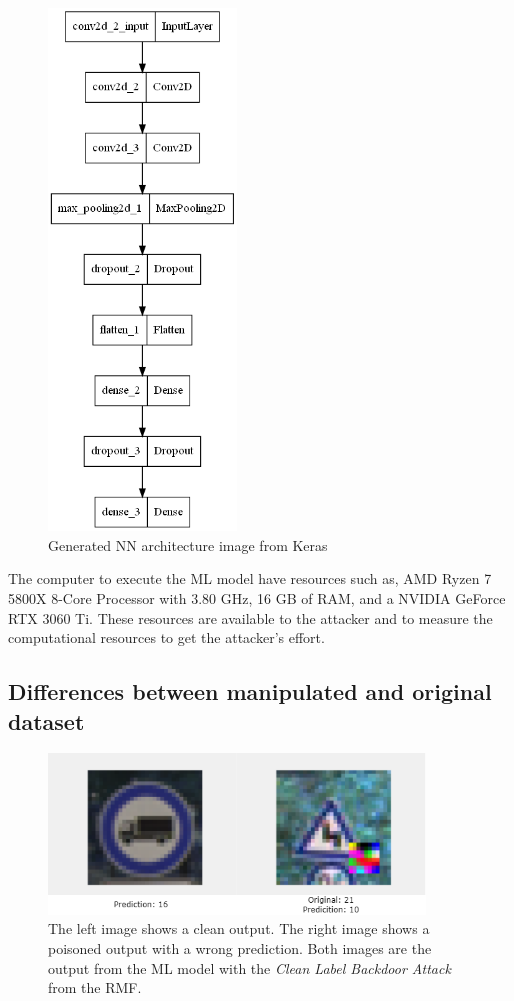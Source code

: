 \begin{figure}[h!]
  \centering
  \includegraphics[width=5cm]{pictures/nn.png}
  \caption{Generated NN architecture image from Keras}
  \label{fig:nn}
\end{figure}

The computer to execute the ML model have resources such as, AMD Ryzen \cite{DBLP:conf/hotchips/AroraBW20} 7 5800X 8-Core Processor with 3.80 GHz, 16 GB of RAM, and a NVIDIA GeForce RTX \cite{DBLP:journals/pcs/SanzharovFG20} 3060 Ti. These resources are available to the attacker and to measure the computational resources to get the attacker's effort.

\subsection{Differences between manipulated and original dataset}

\begin{figure}[ht!]
  \centering
  \includegraphics[width=10cm]{pictures/backdoor_example_rmf.png}
  \caption{The left image shows a clean output. The right image shows a poisoned output with a wrong prediction. Both images are the output from the ML model with the \textit{Clean Label Backdoor Attack} from the RMF.}
  \label{fig:backdoor_example_rmf}
\end{figure}

